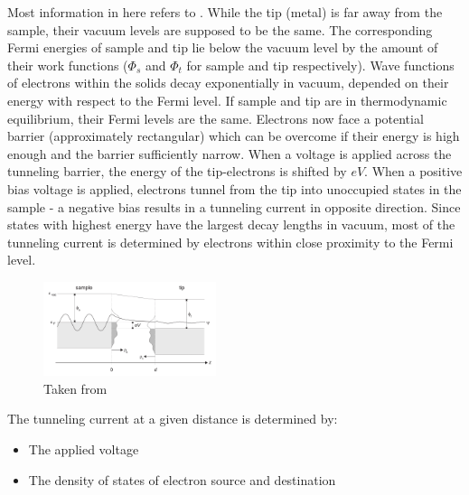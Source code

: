 Most information in here refers to \cite{bonnell_scanning_1993}.
While the tip (metal) is far away from the sample, their vacuum levels are supposed to be the same. The corresponding Fermi energies of sample and tip lie below the vacuum level by the amount of their work functions ($\Phi_s$ and $\Phi_t$ for sample and tip respectively). Wave functions of electrons within the solids decay exponentially in vacuum, depended on their energy with respect to the Fermi level.
If sample and tip are in thermodynamic equilibrium, their Fermi levels are the same. Electrons now face a potential barrier (approximately rectangular) which can be overcome if their energy is high enough and the barrier sufficiently narrow. When a voltage is applied across the tunneling barrier, the energy of the tip-electrons is shifted by $eV$. When a positive bias voltage is applied, electrons tunnel from the tip into unoccupied states in the sample - a negative bias results in a tunneling current in opposite direction. Since states with highest energy have the largest decay lengths in vacuum, most of the tunneling current is determined by electrons within close proximity to the Fermi level.

\begin{figure}[ht]
	\begin{center}
	\includegraphics[width=0.45\textwidth]{./images/tunnel-barrier.jpg}
	\end{center}
	\caption{Taken from \cite{diss-schunack}}
\end{figure}


The tunneling current at a given distance is determined by:
\begin{itemize}
 \item The applied voltage
 \item The density of states of electron source and destination
\end{itemize}

